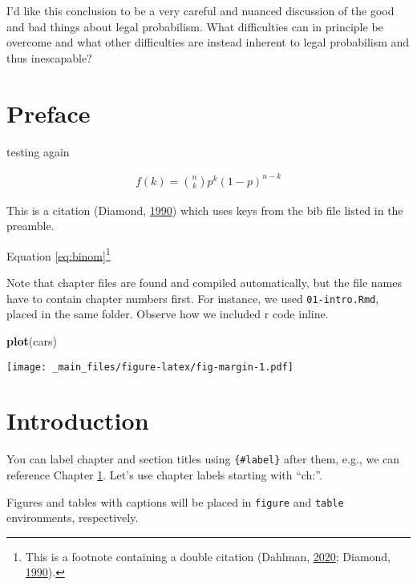 \documentclass[]{book}
\newenvironment{Shaded}{\begin{snugshade}}{\end{snugshade}}
\newcommand{\KeywordTok}[1]{\textcolor[rgb]{0.13,0.29,0.53}{\textbf{#1}}}
\newcommand{\NormalTok}[1]{#1}
\begin{document}
I'd like this conclusion
to be a very
careful and nuanced discussion of the
good and bad things about
legal probabilism. What difficulties can
in principle be overcome and what other difficulties are instead
inherent to legal probabilism and thus inescapable?

\hypertarget{preface}{%
\chapter*{Preface}\label{preface}}

testing again

\begin{align} 
  f\left(k\right) = \binom{n}{k} p^k\left(1-p\right)^{n-k}
  \label{eq:binom}
\end{align}

This is a citation (Diamond, \protect\hyperlink{ref-diamond90}{1990}) which uses keys from the bib file listed in the preamble.

Equation \eqref{eq:binom}\footnote{This is a footnote containing a double citation (Dahlman, \protect\hyperlink{ref-dahlmanNakedStat2020}{2020}; Diamond, \protect\hyperlink{ref-diamond90}{1990}).}

Note that chapter files are found and compiled automatically, but the file names have to contain chapter numbers first. For instance, we used \texttt{01-intro.Rmd}, placed in the same folder. Observe how we included r code inline.

\begin{Shaded}
\begin{Highlighting}[]
\KeywordTok{plot}\NormalTok{(cars)}
\end{Highlighting}
\end{Shaded}

\texttt{[image: \_main\_files/figure-latex/fig-margin-1.pdf]}

\hypertarget{ch:intro}{%
\chapter{Introduction}\label{ch:intro}}

You can label chapter and section titles using \texttt{\{\#label\}} after them, e.g., we can reference Chapter \ref{ch:intro}.
Let's use chapter labels starting with ``ch:''.

Figures and tables with captions will be placed in \texttt{figure} and \texttt{table} environments, respectively.
\end{document}
